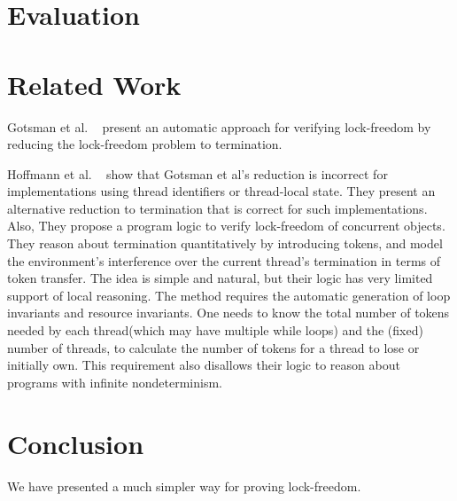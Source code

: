 \documentclass{article}
\begin{document}
\section{Evaluation}
\label{sec:eval}


\section{Related Work}
\label{sec:related}

Gotsman et al. ~\cite{gotsman2009proving} present an automatic approach for verifying lock-freedom by reducing the lock-freedom problem to termination.

Hoffmann et al. ~\cite{hoffmann2013quantitative} show that Gotsman et al's reduction is incorrect for implementations using thread identifiers or thread-local state.
They present an alternative reduction to termination that is correct for such implementations. Also, They propose a program logic to verify lock-freedom of concurrent objects. They reason about termination quantitatively by introducing tokens, and model the environment’s interference over the current thread’s termination in terms of token transfer. The idea is simple and natural, but their logic has very limited support of local reasoning. The method requires the automatic generation of loop invariants and resource invariants. One needs to know the total number of tokens needed by each thread(which may have multiple while loops) and the (fixed) number of threads, to calculate the number of tokens for a thread to lose or initially own. This requirement also disallows their logic to reason about programs with infinite nondeterminism.



\section{Conclusion}
\label{sec:concl}

We have presented a much simpler way for proving lock-freedom.




\end{document}
